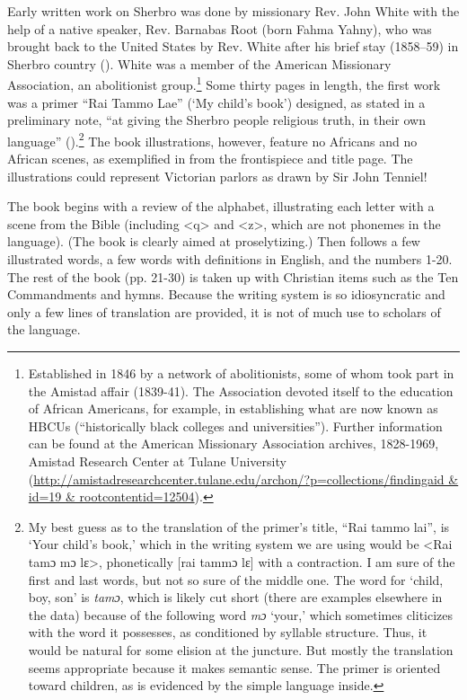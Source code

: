 Early written work on Sherbro was done by missionary Rev. John White with the help of a native speaker, Rev. Barnabas Root (born Fahma Yahny), who was brought back to the United States by Rev. White after his brief stay (1858--59) in Sherbro country (\citealt{Holmes1877}). White was a member of the American Missionary Association, an abolitionist group.\footnote{Established in 1846 by a network of abolitionists, some of whom took part in the Amistad affair (1839-41). The Association devoted itself to the education of African Americans, for example, in establishing what are now known as HBCUs (“historically black colleges and universities”). Further information can be found at the American Missionary Association archives, 1828-1969, Amistad Research Center at Tulane University (\url{http://amistadresearchcenter.tulane.edu/archon/?p=collections/findingaid & id=19 & rootcontentid=12504}).}  Some thirty pages in length, the first work was a primer “Rai Tammo Lae” (‘My child's book') designed, as stated in a preliminary note, “at giving the Sherbro people religious truth, in their own language” (\citealt{White1860}).\footnote{My best guess as to the translation of the primer's title, “Rai tammo lai”, is ‘Your child's book,' which in the writing system we are using would be <Rai tamɔ mɔ lɛ>, phonetically [rai tammɔ lɛ] with a contraction. I am sure of the first and last words, but not so sure of the middle one. The word for ‘child, boy, son' is \textit{tamɔ}, which is likely cut short (there are examples elsewhere in the data) because of the following word \textit{mɔ} ‘your,' which sometimes cliticizes with the word it possesses, as conditioned by syllable structure. Thus, it would be natural for some elision at the juncture. But mostly the translation seems appropriate because it makes semantic sense. The primer is oriented toward children, as is evidenced by the simple language inside.} The book illustrations, however, feature no Africans and no African scenes, as exemplified in  from the frontispiece and title page. The illustrations could represent Victorian parlors as drawn by Sir John Tenniel!

The book begins with a review of the alphabet, illustrating each letter with a scene from the Bible (including <q> and <z>, which are not phonemes in the language). (The book is clearly aimed at proselytizing.) Then follows a few illustrated words, a few words with definitions in English, and the numbers 1-20. The rest of the book (pp. 21-30) is taken up with Christian items such as the Ten Commandments and hymns. Because the writing system is so idiosyncratic and only a few lines of translation are provided, it is not of much use to scholars of the language.

